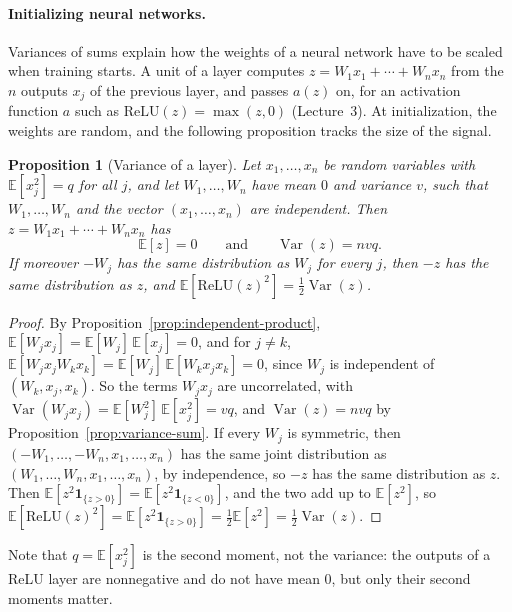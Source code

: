 \documentclass[11pt]{article}
\newcommand{\E}{\mathbb{E}}
\DeclareMathOperator{\Var}{Var}
\theoremstyle{definition}
\theoremstyle{plain}
\newtheorem{proposition}[definition]{Proposition}
\theoremstyle{remark}
\begin{document}
\paragraph{Initializing neural networks.} Variances of sums explain how the weights of a neural network have to be scaled when training starts. A unit of a layer computes $z = W_1x_1 + \cdots + W_nx_n$ from the $n$ outputs $x_j$ of the previous layer, and passes $a(z)$ on, for an activation function $a$ such as $\mathrm{ReLU}(z) = \max(z, 0)$ (Lecture~3). At initialization, the weights are random, and the following proposition tracks the size of the signal.

\begin{proposition}[Variance of a layer]\label{prop:layer-variance}
    Let $x_1, \ldots, x_n$ be random variables with $\E[x_j^2] = q$ for all $j$, and let $W_1, \ldots, W_n$ have mean $0$ and variance $v$, such that $W_1, \ldots, W_n$ and the vector $(x_1, \ldots, x_n)$ are independent. Then $z = W_1x_1 + \cdots + W_nx_n$ has
    \[\E[z] = 0 \qquad \text{and} \qquad \Var(z) = nvq.\]
    If moreover $-W_j$ has the same distribution as $W_j$ for every $j$, then $-z$ has the same distribution as $z$, and $\E[\mathrm{ReLU}(z)^2] = \frac{1}{2}\Var(z)$.
\end{proposition}

\begin{proof}
    By Proposition~\ref{prop:independent-product}, $\E[W_jx_j] = \E[W_j]\,\E[x_j] = 0$, and for $j \neq k$, $\E[W_jx_jW_kx_k] = \E[W_j]\,\E[W_kx_jx_k] = 0$, since $W_j$ is independent of $(W_k, x_j, x_k)$. So the terms $W_jx_j$ are uncorrelated, with $\Var(W_jx_j) = \E[W_j^2]\,\E[x_j^2] = vq$, and $\Var(z) = nvq$ by Proposition~\ref{prop:variance-sum}. If every $W_j$ is symmetric, then $(-W_1, \ldots, -W_n, x_1, \ldots, x_n)$ has the same joint distribution as $(W_1, \ldots, W_n, x_1, \ldots, x_n)$, by independence, so $-z$ has the same distribution as $z$. Then $\E[z^2\mathbf{1}_{\{z > 0\}}] = \E[z^2\mathbf{1}_{\{z < 0\}}]$, and the two add up to $\E[z^2]$, so $\E[\mathrm{ReLU}(z)^2] = \E[z^2\mathbf{1}_{\{z > 0\}}] = \frac{1}{2}\E[z^2] = \frac{1}{2}\Var(z)$.
\end{proof}

Note that $q = \E[x_j^2]$ is the second moment, not the variance: the outputs of a ReLU layer are nonnegative and do not have mean $0$, but only their second moments matter.
\end{document}
